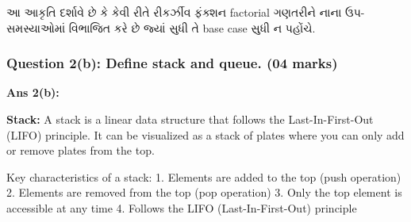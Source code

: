 \begin{Shaded}
\begin{Highlighting}[]
    \OperatorTok{==}  \OperatorTok{==} \NormalTok{:}
         
    \NormalTok{:}
        \OperatorTok{*}\OperatorTok{{-}} \NormalTok{)}

\NormalTok{))  }
\end{Highlighting}
\end{Shaded}

\begin{Shaded}
\begin{Highlighting}[]
\end{Highlighting}
\end{Shaded}

આ આકૃતિ દર્શાવે છે કે કેવી રીતે રીકર્ઝીવ ફંક્શન factorial ગણતરીને નાના ઉપ-સમસ્યાઓમાં
વિભાજિત કરે છે જ્યાં સુધી તે base case સુધી ન પહોંચે.

\hypertarget{question-2b-define-stack-and-queue.-04-marks}{%
\subsubsection{Question 2(b): Define stack and queue. (04
marks)}\label{question-2b-define-stack-and-queue.-04-marks}}

\textbf{Ans 2(b):}

\textbf{Stack:} A stack is a linear data structure that follows the
Last-In-First-Out (LIFO) principle. It can be visualized as a stack of
plates where you can only add or remove plates from the top.

Key characteristics of a stack: 1. Elements are added to the top (push
operation) 2. Elements are removed from the top (pop operation) 3. Only
the top element is accessible at any time 4. Follows the LIFO
(Last-In-First-Out) principle

